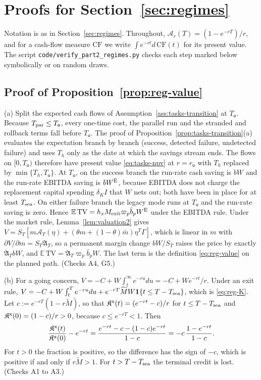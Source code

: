 \section{Proofs for Section~\ref{sec:regimes}}\label{app:proofs-regimes}

Notation is as in Section~\ref{sec:regimes}. Throughout, $\mathcal A_r(T)=(1-e^{-rT})/r$, and for a cash-flow measure $\mathrm{CF}$ we write $\int e^{-rt}d\,\mathrm{CF}(t)$ for its present value. The script \texttt{code/verify\_part2\_regimes.py} checks each step marked below symbolically or on random draws.

\subsection*{Proof of Proposition~\ref{prop:reg-value}}

(a) Split the expected cash flows of Assumption~\ref{ass:tasks-transition} at $T_{\mathsf o}$. Because $T_{\rm par}\le T_{\mathsf o}$, every one-time cost, the parallel run and the stranded and rollback terms fall before $T_{\mathsf o}$. The proof of Proposition~\ref{prop:tasks-transition}(a) evaluates the expectation branch by branch (success, detected failure, undetected failure) and uses $T_h$ only as the date at which the savings stream ends. The flows on $[0,T_{\mathsf o})$ therefore have present value \eqref{eq:tasks-npv} at $r=r_{\mathsf o}$ with $T_h$ replaced by $\min\{T_h,T_{\mathsf o}\}$. At $T_{\mathsf o}$, on the success branch the run-rate cash saving is $bW$ and the run-rate EBITDA saving is $bW^{\rm E}$, because EBITDA does not charge the replacement capital spending $\delta_KI$ that $W$ nets out; both have been in place for at least $T_{\rm sea}$. On either failure branch the legacy mode runs at $T_{\mathsf o}$ and the run-rate saving is zero. Hence $\mathbb E\,\mathrm{TV}=h_xM_{\rm exit}\varpi_p\bar b_pW^{\rm E}$ under the EBITDA rule. Under the market rule, Lemma~\ref{lem:valuation2} gives $V=S_T[m\mathcal A_T(\eta)+(\theta m+(1-\theta)\bar m)\eta^T\Gamma]$, which is linear in $m$ with $\partial V/\partial m=S_T\mathfrak A_T$, so a permanent margin change $bW/S_T$ raises the price by exactly $\mathfrak A_TbW$, and $\mathbb E\,\mathrm{TV}=\mathfrak A_T\varpi_p\bar b_pW$. The last term is the definition \eqref{eq:reg-value} on the planned path. (Checks A4, G5.)

(b) For a going concern, $V=-C+W\int_t^\infty e^{-ru}du=-C+We^{-rt}/r$. Under an exit rule, $V=-C+W\int_t^Te^{-ru}du+e^{-rT}\widetilde MW\mathbf 1\{t\le T-T_{\rm sea}\}$, which is \eqref{eq:reg-K}. Let $c:=e^{-rT}(1-r\widetilde M)$, so that $\mathfrak K^{\rm x}(t)=(e^{-rt}-c)/r$ for $t\le T-T_{\rm sea}$ and $\mathfrak K^{\rm x}(0)=(1-c)/r>0$, because $c\le e^{-rT}<1$. Then
\[
\frac{\mathfrak K^{\rm x}(t)}{\mathfrak K^{\rm x}(0)}-e^{-rt}=\frac{e^{-rt}-c-(1-c)e^{-rt}}{1-c}=-c\,\frac{1-e^{-rt}}{1-c}.
\]
For $t>0$ the fraction is positive, so the difference has the sign of $-c$, which is positive if and only if $r\widetilde M>1$. For $t>T-T_{\rm sea}$ the terminal credit is lost. (Checks A1 to A3.)

